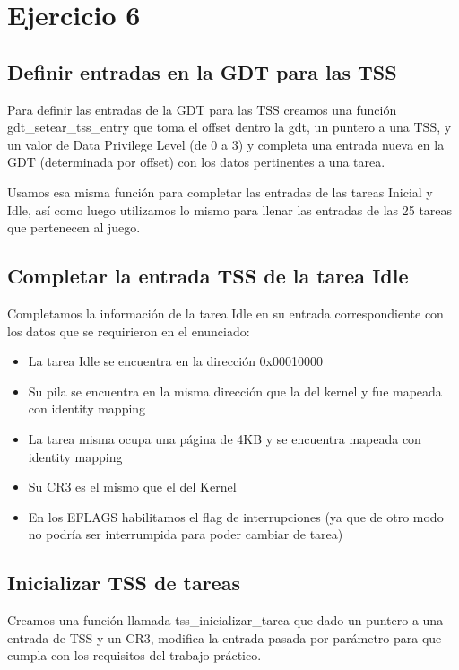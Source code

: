 \section{Ejercicio 6}

\subsection{Definir entradas en la GDT para las TSS}

Para definir las entradas de la GDT para las TSS creamos una función gdt_setear_tss_entry que toma el offset dentro la gdt, un puntero a una TSS, y un valor de Data Privilege Level (de 0 a 3) y completa una entrada nueva en la GDT (determinada por offset) con los datos pertinentes a una tarea.

Usamos esa misma función para completar las entradas de las tareas Inicial y Idle, así como luego utilizamos lo mismo para llenar las entradas de las 25 tareas que pertenecen al juego.

\subsection{Completar la entrada TSS de la tarea Idle}

Completamos la información de la tarea Idle en su entrada correspondiente con los datos que se requirieron en el enunciado:

\begin{itemize}
	\item La tarea Idle se encuentra en la dirección 0x00010000
	\item Su pila se encuentra en la misma dirección que la del kernel y fue mapeada con identity mapping
	\item La tarea misma ocupa una página de 4KB y se encuentra mapeada con identity mapping
	\item Su CR3 es el mismo que el del Kernel
	\item En los EFLAGS habilitamos el flag de interrupciones (ya que de otro modo no podría ser interrumpida para poder cambiar de tarea)
\end{itemize}

\subsection{Inicializar TSS de tareas}

Creamos una función llamada tss_inicializar_tarea que dado un puntero a una entrada de TSS y un CR3, modifica la entrada pasada por parámetro para que cumpla con los requisitos del trabajo práctico.

